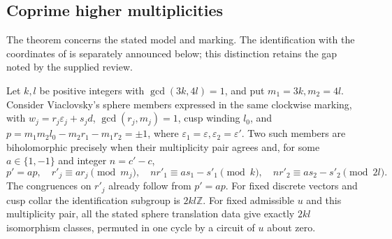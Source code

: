 \subsection{Coprime higher multiplicities}
The theorem concerns the stated model and marking. The identification with the coordinates of \cite[Section 2]{VL26} is separately announced below; this distinction retains the gap noted by the supplied review.
\begin{proposition}[FAM B.3.1; T]\label{fam:B.3.1}
Let $k,l$ be positive integers with $\gcd(3k,4l)=1$, and put $m_1=3k,m_2=4l$. Consider Viaclovsky's sphere members expressed in the same clockwise marking, with $w_j=r_j\varepsilon_j+s_jd$, $\gcd(r_j,m_j)=1$, cusp winding $l_0$, and $p=m_1m_2l_0-m_2r_1-m_1r_2=\pm1$, where $\varepsilon_1=\varepsilon,\varepsilon_2=\varepsilon'$. Two such members are biholomorphic precisely when their multiplicity pair agrees and, for some $a\in\{1,-1\}$ and integer $n=c'-c$,
\[
 p'=ap,\quad r'_j\equiv ar_j\pmod{m_j},\quad
 nr'_1\equiv as_1-s'_1\pmod{k},\quad
 nr'_2\equiv as_2-s'_2\pmod{2l}.
\]
The congruences on $r'_j$ already follow from $p'=ap$. For fixed discrete vectors and cusp collar the identification subgroup is $2kl\mathbb Z$. For fixed admissible $u$ and this multiplicity pair, all the stated sphere translation data give exactly $2kl$ isomorphism classes, permuted in one cycle by a circuit of $u$ about zero.
\end{proposition}
